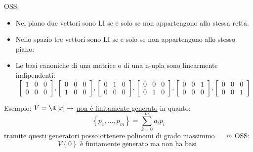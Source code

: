 \documentclass[12pt,a4paper,oneside]{article}
\begin{document}
OSS:
\begin{itemize}
	\item Nel piano due vettori sono LI se e solo se non appartengono alla stessa retta.
	\item Nello spazio tre vettori sono LI se e solo se non appartengono allo stesso piano:
	\item Le basi canoniche di una matrice o di una n-upla sono linearmente indipendenti:
	      \[
		      \left[\begin{array}{lll}1 & 0 & 0 \\ 0 & 0 & 0\end{array}\right],\left[\begin{array}{lll}0 & 0 & 0 \\ 1 & 0 & 0\end{array}\right],\left[\begin{array}{lll}0 & 1 & 0 \\ 0 & 0 & 0\end{array}\right],\left[\begin{array}{lll}0 & 0 & 0 \\ 0 & 1 & 0\end{array}\right],\left[\begin{array}{lll}0 & 0 & 1 \\ 0 & 0 & 0\end{array}\right],\left[\begin{array}{lll}0 & 0 & 0 \\ 0 & 0 & 1\end{array}\right]
	      \]

\end{itemize}
Esempio: $V = \R\left[ x \right] \rightarrow $ \underline{non è finitamente generato}
in quanto:
\[
	\left\{ p_1,\ldots,p_m \right\} = \sum_{k=0}^{m} a_ip_i
\]
tramite questi generatori posso ottenere polinomi di grado massimmo $= m$
\vskip3mm
OSS:
\[
	V\left\{ 0 \right\}  \text{ è finitamente generato ma non ha basi }
\]
\end{document}
